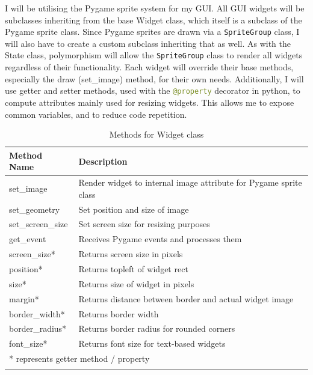 \documentclass[../main/main.tex]{subfiles}
\begin{document}
I will be utilising the Pygame sprite system for my GUI. All GUI widgets will be subclasses inheriting from the base Widget class, which itself is a subclass of the Pygame sprite class.
Since Pygame sprites are drawn via a \lstinline{SpriteGroup} class, I will also have to create a custom subclass inheriting that as well. As with the State class, polymorphism will allow the \lstinline{SpriteGroup} class to render all widgets regardless of their functionality. Each widget will override their base methods, especially the draw (set\_image) method, for their own needs. Additionally, I will use getter and setter methods, used with the \lstinline[language=Python]{@property} decorator in python, to compute attributes mainly used for resizing widgets. This allows me to expose common variables, and to reduce code repetition.

\begin{longtable}[c]{l|l}
    \toprule
    \textbf{Method Name} & \textbf{Description}\\
    \midrule
    \endfirsthead
    \endhead

    set\_image & Render widget to internal image attribute for Pygame sprite class\\
    set\_geometry & Set position and size of image\\
    set\_screen\_size & Set screen size for resizing purposes\\
    get\_event & Receives Pygame events and processes them\\
    screen\_size* & Returns screen size in pixels\\
    position* & Returns topleft of widget rect\\
    size* & Returns size of widget in pixels\\
    margin* & Returns distance between border and actual widget image\\
    border\_width* & Returns border width\\
    border\_radius* & Returns border radius for rounded corners\\
    font\_size* & Returns font size for text-based widgets\\

    \midrule

    \multicolumn{2}{l}{* represents getter method / property}\\

    \bottomrule

\caption{Methods for Widget class}
\label{tab:widget-methods}
\end{longtable}
\end{document}
